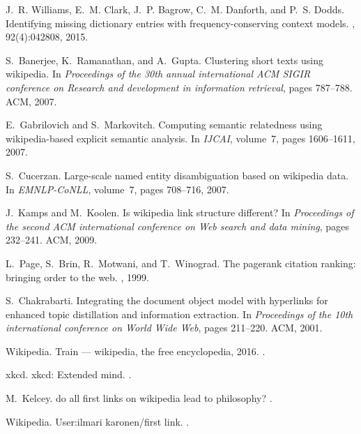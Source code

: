 \documentclass[pre,twocolumn,twoside,superscriptaddress,floatfix]{revtex4-1}
\begin{document}
{\begin{thebibliography}{10}
J.~R. Williams, E.~M. Clark, J.~P. Bagrow, C.~M. Danforth, and P.~S. Dodds.
\newblock Identifying missing dictionary entries with frequency-conserving
  context models.
, 92(4):042808, 2015.

S.~Banerjee, K.~Ramanathan, and A.~Gupta.
\newblock Clustering short texts using wikipedia.
\newblock In {\em Proceedings of the 30th annual international ACM SIGIR
  conference on Research and development in information retrieval}, pages
  787--788. ACM, 2007.

E.~Gabrilovich and S.~Markovitch.
\newblock Computing semantic relatedness using wikipedia-based explicit
  semantic analysis.
\newblock In {\em IJCAI}, volume~7, pages 1606--1611, 2007.

S.~Cucerzan.
\newblock Large-scale named entity disambiguation based on wikipedia data.
\newblock In {\em EMNLP-CoNLL}, volume~7, pages 708--716, 2007.

J.~Kamps and M.~Koolen.
\newblock Is wikipedia link structure different?
\newblock In {\em Proceedings of the second ACM international conference on Web
  search and data mining}, pages 232--241. ACM, 2009.

L.~Page, S.~Brin, R.~Motwani, and T.~Winograd.
\newblock The pagerank citation ranking: bringing order to the web.
, 1999.

S.~Chakrabarti.
\newblock Integrating the document object model with hyperlinks for enhanced
  topic distillation and information extraction.
\newblock In {\em Proceedings of the 10th international conference on World
  Wide Web}, pages 211--220. ACM, 2001.

Wikipedia.
\newblock Train --- wikipedia{,} the free encyclopedia, 2016.
.

xkcd.
\newblock xkcd: Extended mind.
.

M.~Kelcey.
\newblock do all first links on wikipedia lead to philosophy?
.

Wikipedia.
\newblock User:ilmari karonen/first link.
.


\end{thebibliography}}
\end{document}
